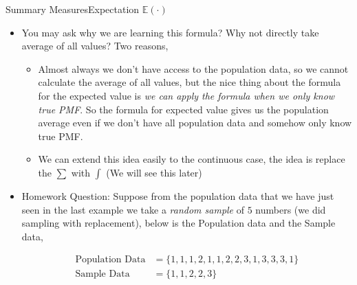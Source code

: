 \documentclass[8pt, usepdftitle = false]{beamer}
\begin{document}
\begin{frame}[allowframebreaks]{Summary Measures}{Expectation $\mathbb{E}(\cdot)$}
\begin{itemize}
\begin{table}[H]
\centering
	\begin{tabular}{c|c}
$x$ & $f(x)$ \\
\hline $1$ & $7 / 14$ \\
$2$ &  $3/14$  \\
$3$ & $4/14$
\end{tabular}
\end{table}

Now with this PMF we can calculate the expected value as

\begin{align*}
\mathbb{E}(X) &= \left(1 \times f(1)\right) + \left(2 \times f(2)\right) + \left(3 \times f(3)\right) =\left(1 \times 7/14\right) + \left(2 \times 3/14\right) + \left(3 \times 4/14\right) \\
&= \frac{7 + 6 + 12}{14} = \frac{25}{14}
\end{align*}

which gives us the same result as before. 


\framebreak




\item You may ask why we are learning this formula? Why not directly take average of all values? Two reasons,

\medskip
\begin{itemize}

	\item  Almost always we don't have access to the population data, so we cannot calculate the average of all values, but the nice thing about the formula for the expected value is \emph{we can apply the formula when we only know true PMF}. So the formula for expected value gives us the population average even if we don't have all population data and somehow only know true PMF.
	

\medskip
	\item We can extend this idea easily to the continuous case, the idea is replace the $\sum$ with $\int$ (We will see this later)
\end{itemize}

\framebreak


\item \alert{Homework Question:} Suppose from the population data that we have just seen in the last example we take a \emph{random sample} of $5$ numbers (we did \alert{sampling with replacement)}, below is the Population data and the Sample data,

\begin{align*}
	\text{Population Data} &= \{1, 1, 1, 2, 1, 1, 2, 2, 3, 1, 3, 3, 3, 1\} \\
		\text{Sample Data} &= \{1, 1, 2, 2, 3\}
\end{align*}


\end{itemize}
\end{frame}
\end{document}
